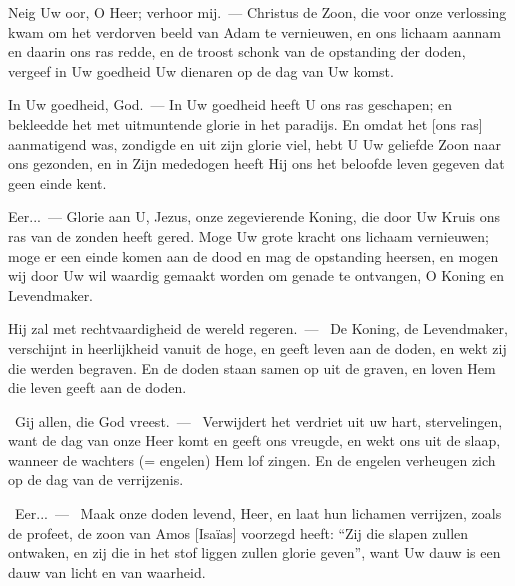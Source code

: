 \documentclass[12pt,twoside,a5paper]{article}
\begin{document}
\CLEARPAGEAV


\vspace{0.5em}

\begin{halfparskip}
   Neig Uw oor, O Heer; verhoor mij.~--- Christus de Zoon, die voor onze verlossing kwam om het verdorven beeld van Adam te vernieuwen, en ons lichaam aannam en daarin ons ras redde, en de troost schonk van de opstanding der doden, vergeef in Uw goedheid Uw dienaren op de dag van Uw komst.

  In Uw goedheid, God.~--- In Uw goedheid heeft U ons ras geschapen; en bekleedde het met uitmuntende glorie in het paradijs. En omdat het [ons ras] aanmatigend was, zondigde en uit zijn glorie viel, hebt U Uw geliefde Zoon naar ons gezonden, en in Zijn mededogen heeft Hij ons het beloofde leven gegeven dat geen einde kent.

  Eer...~--- Glorie aan U, Jezus, onze zegevierende Koning, die door Uw Kruis ons ras van de zonden heeft gered. Moge Uw grote kracht ons lichaam vernieuwen; moge er een einde komen aan de dood en mag de opstanding heersen, en mogen wij door Uw wil waardig gemaakt worden om genade te ontvangen, O Koning en Levendmaker.
\end{halfparskip}

\begin{halfparskip}
   Hij zal met rechtvaardigheid de wereld regeren.~--- \rr~De Koning, de Levendmaker, verschijnt in heerlijkheid vanuit de hoge, en geeft leven aan de doden, en wekt zij die werden begraven. En de doden staan samen op uit de graven, en loven Hem die leven geeft aan de doden.

  \dd~Gij allen, die God vreest.~--- \rr~Verwijdert het verdriet uit uw hart, stervelingen, want de dag van onze Heer komt en geeft ons vreugde, en wekt ons uit de slaap, wanneer de wachters (= engelen) Hem lof zingen. En de engelen verheugen zich op de dag van de verrijzenis.

  \cc~Eer...~--- \rr~Maak onze doden levend, Heer, en laat hun lichamen verrijzen, zoals de profeet, de zoon van Amos [Isaïas] voorzegd heeft: ``Zij die slapen zullen ontwaken, en zij die in het stof liggen zullen glorie geven'', want Uw dauw is een dauw van licht en van waarheid.
\end{halfparskip}

\end{document}
